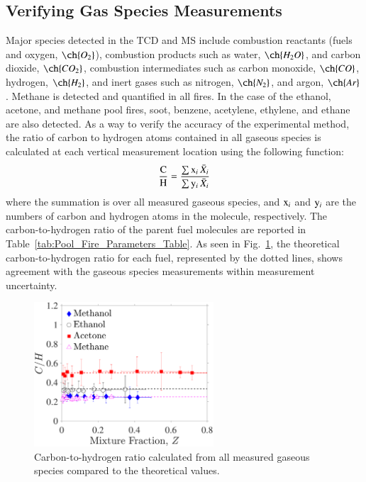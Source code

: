 \documentclass[preprint,review,12pt]{elsarticle}
\begin{document}
\subsection{Verifying Gas Species Measurements}
\label{ssec:Verifying_Vol_Frac_Measurements}
Major species detected in the TCD and MS include combustion reactants (fuels and oxygen, $\ch{O_2}$), combustion products such as water, $\ch{H_{2}O}$, and carbon dioxide, $\ch{CO_{2}}$, combustion intermediates such as carbon monoxide, $\ch{CO}$, hydrogen, $\ch{H_{2}}$, and inert gases such as nitrogen, $\ch{N_{2}}$, and argon, $\ch{Ar}$. Methane is detected and quantified in all fires. In the case of the ethanol, acetone, and methane pool fires, soot, benzene, acetylene, ethylene, and ethane are also detected. 
As a way to verify the accuracy of the experimental method, the ratio of carbon to hydrogen atoms contained in all gaseous species is calculated at each vertical measurement location using the following function:
\begin{equation}\label{eq:c2h_ratio}
 \frac{\rm C}{\rm H}=\frac{ \sum {\rm x}_i \, \bar{X}_{i} }{ \sum {\rm y}_i \, \bar{X}_{i} }
\end{equation}
where the summation is over all measured gaseous species, and ${\rm x}_i$ and ${\rm y}_i$ are the numbers of carbon and hydrogen atoms in the molecule, respectively. The carbon-to-hydrogen ratio of the parent fuel molecules are reported in Table~\ref{tab:Pool_Fire_Parameters_Table}. As seen in Fig.~\ref{fig:C2H}, the theoretical carbon-to-hydrogen ratio for each fuel, represented by the dotted lines, shows agreement with the gaseous species measurements within measurement uncertainty.
\begin{figure}[h!]
	\centering
\includegraphics[width=6.7cm, keepaspectratio]{C2H_ratio_Comparison.pdf}
	\caption[Carbon to hydrogen ratio calculated from all species]{Carbon-to-hydrogen ratio calculated from all measured gaseous species compared to the theoretical values.}
	\label{fig:C2H}
\end{figure}
\end{document}
